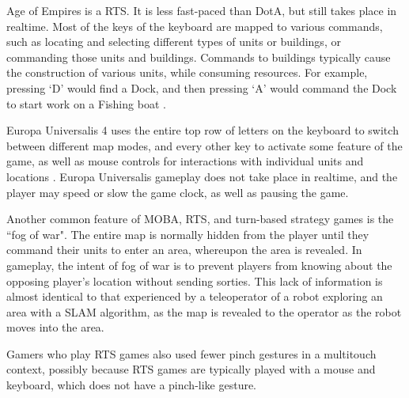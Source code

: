 Age of Empires is a RTS. 
It is less fast-paced than DotA, but still takes place in realtime. 
Most of the keys of the keyboard are mapped to various commands, such as locating and selecting different types of units or buildings, or commanding those units and buildings. 
Commands to buildings typically cause the construction of various units, while consuming resources. 
For example, pressing `D' would find a Dock, and then pressing `A' would command the Dock to start work on a Fishing boat . 

Europa Universalis 4 uses the entire top row of letters on the keyboard to switch between different map modes, and every other key to activate some feature of the game, as well as mouse controls for interactions with individual units and locations . 
Europa Universalis gameplay does not take place in realtime, and the player may speed or slow the game clock, as well as pausing the game. 

Another common feature of MOBA, RTS, and turn-based strategy games is the ``fog of war". 
The entire map is normally hidden from the player until they command their units to enter an area, whereupon the area is revealed. 
In gameplay, the intent of fog of war is to prevent players from knowing about the opposing player's location without sending sorties. 
This lack of information is almost identical to that experienced by a teleoperator of a robot exploring an area with a SLAM algorithm, as the map is revealed to the operator as the robot moves into the area. 


Gamers who play RTS games also used fewer pinch gestures in a multitouch context, possibly because RTS games are typically played with a mouse and keyboard, which does not have a pinch-like gesture. 

